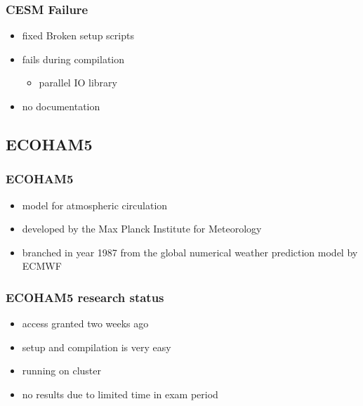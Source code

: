 \documentclass[compress]{beamer}
\begin{document}
\begin{frame}
    \frametitle{CESM Failure}
    	\begin{itemize}
		    \item fixed Broken setup scripts
		    \item fails during compilation
		    \begin{itemize}
		        \item parallel IO library
		    \end{itemize}
		    \item no documentation
		\end{itemize}
\end{frame}

\subsection{ECOHAM5}
\begin{frame}
	\frametitle{ECOHAM5}
	\begin{itemize}
		\item model for atmospheric circulation \cite{echam}
		\item developed by the Max Planck Institute for Meteorology
		\item branched in year 1987 from the global numerical weather prediction model by ECMWF
	\end{itemize}
\end{frame}

\begin{frame}
	\frametitle{ECOHAM5 research status}
	\begin{itemize}
		\item access granted two weeks ago
		\item setup and compilation is very easy
		\item running on cluster
		\item no results due to limited time in exam period
	\end{itemize}
\end{frame}
\end{document}
